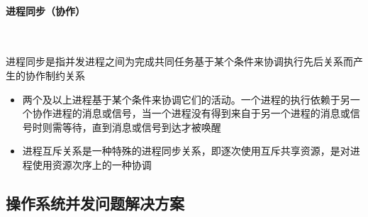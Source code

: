 \documentclass[cs4size,a4paper,10pt]{ctexart}
\begin{document}
	\paragraph{进程同步（协作）}~{}

	进程同步是指并发进程之间为完成共同任务基于某个条件来协调执行先后关系而产生的协作制约关系
	\begin{itemize}
		\item 两个及以上进程基于某个条件来协调它们的活动。一个进程的执行依赖于另一个协作进程的消息或信号，当一个进程没有得到来自于另一个进程的消息或信号时则需等待，直到消息或信号到达才被唤醒
		\item 进程互斥关系是一种特殊的进程同步关系，即逐次使用互斥共享资源，是对进程使用资源次序上的一种协调
	\end{itemize}

	\subsection{操作系统并发问题解决方案}
\end{document}
